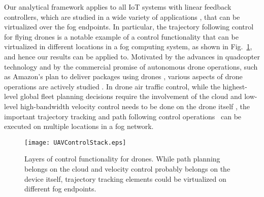 \documentclass[10pt, journal, letterpaper]{IEEEtran}
\newcommand{\1}{\ensuremath{\mathbf{1}}} %
\begin{document}
Our analytical framework applies to all IoT systems with linear feedback controllers, which are studied in a wide
variety of applications \cite{astrom2010feedback, Bertsekas95}, that can be virtualized over the fog endpoints.  In particular, the trajectory following control for flying drones is a notable example of a control functionality that can be virtualized in different locations in a fog computing system, as shown in Fig.~\ref{fig:UAVControl}, and hence our results can be applied to. Motivated by the advances in quadcopter technology and by the commercial promise of autonomous drone operations, such as Amazon's plan to deliver packages using drones \cite{AmazonAir2017}, various aspects of drone operations are actively studied \cite{Khan2017Information,Wang2016Skyeyes}.
In drone air traffic control, while the highest-level global fleet planning decisions require the involvement of the cloud and low-level high-bandwidth velocity control needs to be done on the drone itself \cite{Bregu2016Reactive}, the important trajectory tracking and path following control operations~\cite{Sujit2013PathFollowing,Kukreti2016Genetically} can be executed on multiple locations in a fog network.


\begin{figure}[!t]
  \centering
  \texttt{[image: UAVControlStack.eps]}
    \vspace{-0.2cm}
  \caption{Layers of control functionality for drones. While path planning belongs on the cloud and velocity control probably belongs on the device itself, trajectory tracking elements could be virtualized on different fog endpoints. \label{fig:UAVControl}}
  \vspace{-0.2cm}
\end{figure} %
\end{document}
